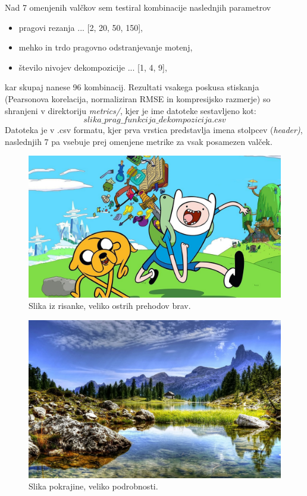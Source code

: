 \documentclass[a4paper,11pt]{article}
\begin{document}
Nad 7 omenjenih valčkov sem testiral kombinacije naslednjih parametrov
\begin{itemize}
	\item pragovi rezanja ... [2, 20, 50, 150],
    \item mehko in trdo pragovno odstranjevanje motenj,
    \item število nivojev dekompozicije ... [1, 4, 9],
\end{itemize}
kar skupaj nanese 96 kombinacij. Rezultati vsakega poskusa stiskanja (Pearsonova korelacija, normaliziran RMSE in kompresijsko razmerje) so shranjeni v direktoriju \textit{metrics/}, kjer je ime datoteke sestavljeno kot:
$$slika\_prag\_funkcija\_dekompozicija.csv$$
Datoteka je v .csv formatu, kjer prva vrstica predstavlja imena stolpcev (\textit{header)}, naslednjih 7 pa vsebuje prej omenjene metrike za vsak posamezen valček.

\begin{figure}[htbp]
\begin{center}
\includegraphics[width=1\textwidth]{images/adventuretime.jpg}
\caption{Slika iz risanke, veliko ostrih prehodov brav.}
\label{slika1}
\end{center}
\end{figure}

\begin{figure}[htbp]
\begin{center}
\includegraphics[width=1\textwidth]{images/country.jpg}
\caption{Slika pokrajine, veliko podrobnosti.}
\label{slika2}
\end{center}
\end{figure}
\end{document}
